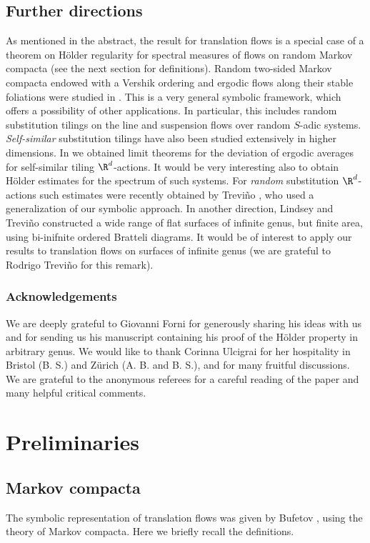 \subsection{Further directions} As mentioned in the abstract, the result for translation flows is a special case of a theorem on Hölder regularity for spectral measures of flows on random Markov compacta (see the next section for definitions).
Random two-sided Markov compacta endowed with a Vershik ordering and ergodic flows along their stable foliations were studied in \cite{Buf-umn}.
This is a very general symbolic framework, which offers a possibility of other applications. In particular, this includes random substitution tilings on the line and suspension flows over random $S$-adic systems.
\emph{Self-similar} substitution tilings have also been studied extensively in higher dimensions. In \cite{BuSol--limit} we obtained limit theorems for the deviation of ergodic averages for self-similar tiling $\R^d$-actions. It would be very interesting also to obtain Hölder estimates for the spectrum of such systems. For \emph{random} substitution $\R^d$-actions such estimates were recently obtained by
Trevi\~no \cite{Tre_prepint}, who used a generalization of our symbolic approach. In another direction,
Lindsey and Trevi\~no \cite{LinTre} constructed a wide range of flat surfaces of infinite genus, but finite area, using bi-inifnite ordered Bratteli diagrams. It would be of interest to apply our results to translation flows on surfaces of infinite genus (we are grateful to Rodrigo Trevi\~no for this remark).

\subsubsection*{Acknowledgements} We are deeply grateful to Giovanni Forni for generously sharing his ideas with us and for sending us his manuscript containing his proof of the Hölder property in arbitrary genus. We would like to thank Corinna Ulcigrai for her hospitality in Bristol (B. S.) and Zürich (A. B. and B. S.), and for many fruitful discussions. We are grateful to the anonymous referees for a careful reading of the paper and many helpful critical comments.

\section{Preliminaries}

\subsection{Markov compacta}\label{subsec:2.1}
The symbolic representation of translation flows was given by Bufetov \cite{Buf-umn}, using the theory of Markov compacta. Here we briefly recall the definitions.

